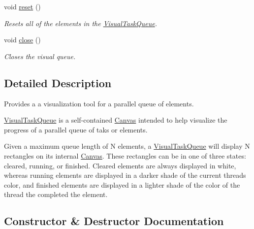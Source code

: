 \begin{DoxyCompactItemize}
void \hyperlink{classtsgl_1_1_visual_task_queue_a1cd23a5361c0209ac950db6afcd68a19}{reset} ()
\begin{DoxyCompactList}\small\item\em Resets all of the elements in the \hyperlink{classtsgl_1_1_visual_task_queue}{Visual\+Task\+Queue}. \end{DoxyCompactList}\item 
void \hyperlink{classtsgl_1_1_visual_task_queue_a7340d211424a9f947152fed22cce4d79}{close} ()
\begin{DoxyCompactList}\small\item\em Closes the visual queue. \end{DoxyCompactList}\end{DoxyCompactItemize}


\subsection{Detailed Description}
Provides a a visualization tool for a parallel queue of elements. 

\hyperlink{classtsgl_1_1_visual_task_queue}{Visual\+Task\+Queue} is a self-\/contained \hyperlink{classtsgl_1_1_canvas}{Canvas} intended to help visualize the progress of a parallel queue of taks or elements.

Given a maximum queue length of {\ttfamily N} elements, a \hyperlink{classtsgl_1_1_visual_task_queue}{Visual\+Task\+Queue} will display {\ttfamily N} rectangles on its internal \hyperlink{classtsgl_1_1_canvas}{Canvas}. These rectangles can be in one of three states\+: cleared, running, or finished. Cleared elements are always displayed in white, whereas running elements are displayed in a darker shade of the current thread\textquotesingle{}s color, and finished elements are displayed in a lighter shade of the color of the thread the completed the element. 

\subsection{Constructor \& Destructor Documentation}
\hypertarget{classtsgl_1_1_visual_task_queue_ad82aabf35ec367b2b0c5894999f5e76e}{}
